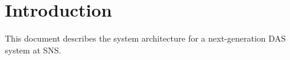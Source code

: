 \section{Introduction}


This document describes the system architecture for a next-generation
DAS system at SNS. 

